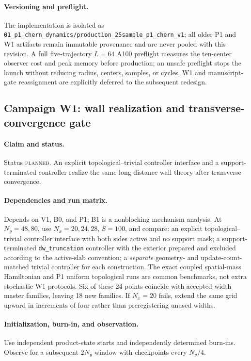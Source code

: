 \documentclass[aps,prx,onecolumn,nofootinbib,superscriptaddress,longbibliography]{revtex4-2}
\newcommand{\code}[1]{\texttt{#1}}
\newcommand{\planned}{\textsc{planned}}
\begin{document}
\paragraph{Versioning and preflight.}
The implementation is isolated as
\code{01\_p1\_chern\_dynamics/production\_25sample\_p1\_chern\_v1}; all older P1 and
W1 artifacts remain immutable provenance and are never pooled with this revision.  A full
five-trajectory $L=64$ A100 preflight measures the ten-center observer cost and peak
memory before production; an unsafe preflight stops the launch without reducing radius,
centers, samples, or cycles.  W1 and manuscript-gate reassignment are explicitly deferred
to the subsequent redesign.

\subsection{Campaign W1: wall realization and transverse-convergence gate}
\paragraph{Claim and status.}
Status \planned.  An explicit topological--trivial controller interface and a
support-terminated controller realize the same long-distance wall theory after transverse
convergence.

\paragraph{Dependencies and run matrix.}
Depends on V1, B0, and P1; B1 is a nonblocking mechanism analysis.  At $N_y=48,80$, use
$N_x=20,24,28$, $S=100$, and compare:
an explicit topological--trivial controller interface with both sides active and no support
mask; a support-terminated \code{dw\_truncation} controller with the exterior prepared and
excluded according to the active-slab convention; a \emph{separate} geometry- and
update-count-matched trivial controller for each construction.  The exact coupled
spatial-mass Hamiltonian and P1 uniform topological runs are common benchmarks, not extra
stochastic W1 protocols.  Six of these 24 points coincide with accepted-width master
families, leaving 18 new families.  If $N_x=20$ fails, extend the same grid upward in
increments of four rather than preregistering unused widths.

\paragraph{Initialization, burn-in, and observation.}
Use independent product-state starts and independently determined burn-ins.  Observe for a
subsequent $2N_y$ window with checkpoints every $N_y/4$.
\end{document}
